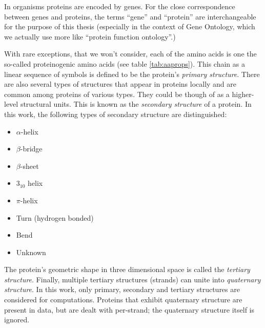 \documentclass[11pt,twoside,a4paper]{book}
\begin{document}
In organisms proteins are encoded by genes. 
For the close correspondence between genes and proteins,
the terms ``gene'' and ``protein'' are interchangeable for the purpose of this thesis
(especially in the context of Gene Ontology, which we actually use more like ``protein function ontology''.)

With rare exceptions, that we won't consider, each of the amino acids is one the
so-called proteinogenic amino acids (see table \ref{tab:aaprops}). 
This chain as a linear sequence of symbols is defined to be the protein's \emph{primary structure}.
There are also several types of structures that appear in proteins locally and are common among
proteins of various types.
They could be though of as a higher-level structural units. This is known as the \emph{secondary structure}
of a protein. In this work, the following types of secondary structure are distinguished:
\begin{itemize}
 \item $\alpha$-helix
 \item $\beta$-bridge
 \item $\beta$-sheet
 \item $3_{10}$ helix
 \item $\pi$-helix
 \item Turn (hydrogen bonded)
 \item Bend
 \item Unknown
\end{itemize}
The protein's geometric shape in three dimensional space is called the \emph{tertiary structure}. 
Finally, multiple tertiary structures (strands) can unite into \emph{quaternary structure}.
In this work, only primary, secondary and tertiary structures are considered for computations.
Proteins that exhibit quaternary structure are present in data, but are dealt with per-strand; 
the quaternary structure itself is ignored.
\end{document}
